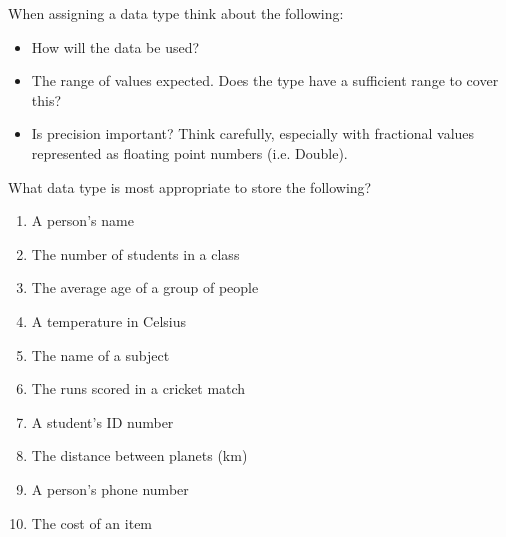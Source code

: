 \begin{enumerate}
When assigning a data type think about the following:
\begin{itemize}
  \item How will the data be used?
  \item The range of values expected. Does the type have a sufficient range to cover this?
  \item Is precision important? Think carefully, especially with fractional values represented as floating point numbers (i.e. Double).
\end{itemize}
  What data type is most appropriate to store the following?
  \begin{multicols}{2}
    \begin{enumerate}
      \item A person’s name
      \item The number of students in a class
      \item The average age of a group of people
      \item A temperature in Celsius
      \item The name of a subject
      \item The runs scored in a cricket match
      \item A student’s ID number
      \item The distance between planets (km)
      \item A person’s phone number
      \item The cost of an item
    \end{enumerate}
  \end{multicols}
\end{enumerate}


